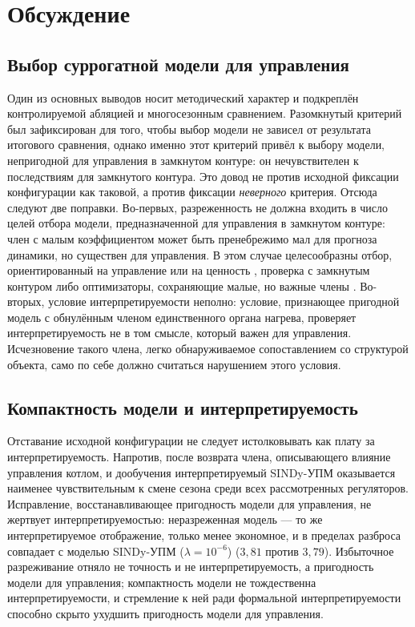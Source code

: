 \documentclass[12pt,a4paper,leqno]{article}
\begin{document}
\section{Обсуждение}
\label{sec:discussion}

\subsection{Выбор суррогатной модели для управления}
Один из основных выводов носит методический характер и подкреплён контролируемой
абляцией и многосезонным сравнением. Разомкнутый критерий был зафиксирован для того,
чтобы выбор модели не зависел от результата итогового сравнения, однако именно этот
критерий привёл к выбору модели, непригодной для управления в замкнутом контуре: он
нечувствителен к последствиям для замкнутого контура. Это довод не против исходной фиксации конфигурации как таковой, а против
фиксации \emph{неверного} критерия. Отсюда следуют две поправки. Во-первых,
разреженность не должна входить в число целей отбора модели, предназначенной для
управления в замкнутом контуре: член с малым коэффициентом может быть пренебрежимо мал
для прогноза динамики, но существен для управления. В этом случае целесообразны отбор,
ориентированный на управление или на ценность
\cite{controlorientedsurvey2025,farahmand2017}, проверка с замкнутым контуром либо
оптимизаторы, сохраняющие малые, но важные члены
\cite{cortiella2021,balanceguided2026}. Во-вторых, условие интерпретируемости неполно:
условие, признающее пригодной модель с обнулённым членом единственного органа нагрева,
проверяет интерпретируемость не в том смысле, который важен для управления. Исчезновение
такого члена, легко обнаруживаемое сопоставлением со структурой объекта, само по себе
должно считаться нарушением этого условия.

\subsection{Компактность модели и интерпретируемость}
Отставание исходной конфигурации не следует истолковывать как плату за интерпретируемость.
Напротив, после возврата члена, описывающего влияние управления котлом, и дообучения интерпретируемый SINDy-УПМ оказывается
наименее чувствительным к смене сезона среди всех рассмотренных регуляторов.
Исправление, восстанавливающее пригодность модели для управления, не жертвует интерпретируемостью: неразреженная модель — то
же интерпретируемое отображение, только менее экономное, и в пределах разброса совпадает с
моделью SINDy-УПМ ($\lambda=10^{-6}$) ($3{,}81$ против $3{,}79$). Избыточное разреживание отняло не
точность и не интерпретируемость, а пригодность модели для управления; компактность модели не тождественна
интерпретируемости, и стремление к ней ради формальной интерпретируемости способно
скрыто ухудшить пригодность модели для управления.
\end{document}
